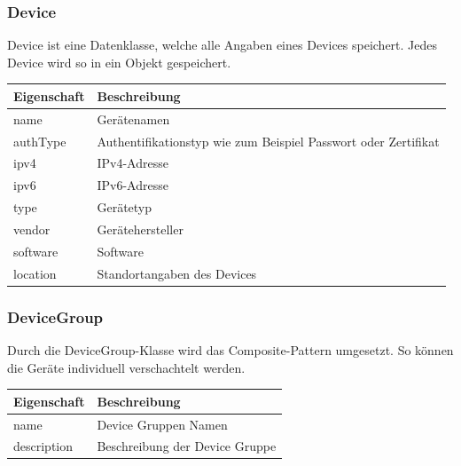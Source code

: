 \subsubsection{Device}
Device ist eine Datenklasse, welche alle Angaben eines Devices speichert. Jedes Device wird so in ein Objekt gespeichert.
\begin{table}[H]
\centering
    \begin{tabular}{@{}l p{14.1cm} @{}}\toprule    
    {Eigenschaft} & {Beschreibung}\\ \midrule      
    name & Gerätenamen \\
    authType & Authentifikationstyp wie zum Beispiel Passwort oder Zertifikat  \\
    ipv4 &  IPv4-Adresse\\
    ipv6 &  IPv6-Adresse\\
    type &  Gerätetyp\\
    vendor & Gerätehersteller \\
    software & Software \\
	location &  Standortangaben des Devices\\    
    \bottomrule
    \end{tabular}
\end{table}

\subsubsection{DeviceGroup}
Durch die DeviceGroup-Klasse wird das Composite-Pattern umgesetzt. So können die Geräte individuell verschachtelt werden.
\begin{table}[H]
\centering
    \begin{tabular}{@{}l p{14.1cm} @{}}\toprule    
    {Eigenschaft} & {Beschreibung}\\ \midrule      
    name & Device Gruppen Namen\\
    description & Beschreibung der Device Gruppe \\
    \bottomrule
    \end{tabular}
\end{table}

